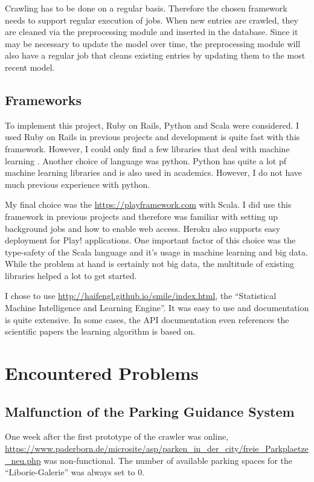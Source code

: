 \documentclass[journal,10pt]{IEEEtran}
\begin{document}
Crawling has to be done on a regular basis. Therefore the chosen framework needs to support regular execution of jobs. When new entries are crawled, they are cleaned via the preprocessing module and inserted in the database. Since it may be necessary to update the model over time, the preprocessing module will also have a regular job that cleans existing entries by updating them to the most recent model.



\subsection{Frameworks}\label{sec:frameworks}
To implement this project, Ruby on Rails, Python and Scala were considered. I used Ruby on Rails in previous projects and development is quite fast with this framework. However, I could only find a few libraries that deal with machine learning \cite{bigml} \cite{leanpanda}. 
Another choice of language was python. Python has quite a lot pf machine learning libraries and is also used in academics. However, I do not have much previous experience with python.

My final choice was the \href{Play! framework}{https://playframework.com} with Scala. I did use this framework in previous projects and therefore was familiar with setting up background jobs and how to enable web access. Heroku also supports easy deployment for Play! applications. One important factor of this choice was the type-safety of the Scala language and it's usage in machine learning and big data. While the problem at hand is certainly not big data, the multitude of existing libraries helped a lot to get started.

I chose to use \href{Smile}{http://haifengl.github.io/smile/index.html}, the ``Statistical Machine Intelligence and Learning Engine''. It was easy to use and documentation is quite extensive. In some cases, the API documentation even references the scientific papers the learning algorithm is based on. 


\section{Encountered Problems}
\subsection{Malfunction of the Parking Guidance System}
One week after the first prototype of the crawler was online, \url{https://www.paderborn.de/microsite/asp/parken_in_der_city/freie_Parkplaetze_neu.php} was non-functional. The number of available parking spaces for the ``Liborie-Galerie'' was always set to \(0\).
\end{document}
